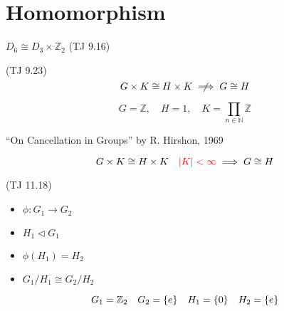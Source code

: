 \section{Homomorphism}

\begin{frame}{$D_6 \cong D_3 \times \mathbb{Z}_{2}$ (TJ 9.16)}
\end{frame}

\begin{frame}{(TJ 9.23)}
  \[
    G \times K \cong H \times K \centernot\implies G \cong H
  \]

  \[
    G = \mathbb{Z}, \quad H = {1}, \quad K = \prod_{n \in \mathbb{N}} \mathbb{Z}
  \]

  \centerline{``On Cancellation in Groups'' by R. Hirshon, 1969}

  \[
    G \times K \cong H \times K \quad \textcolor{red}{|K| < \infty} \implies G \cong H
  \]
\end{frame}
\begin{frame}{(TJ 11.18)}
  \begin{itemize}
    \item $\phi: G_1 \to G_2$
    \item $H_1 \triangleleft G_1$
    \item $\phi(H_1) = H_2$
    \item $G_1/H_1 \cong G_2/H_2$
  \end{itemize}

  \[
    G_1 = \mathbb{Z}_{2} \quad G_2 = \{e\} \quad H_1 = \{0\} \quad H_2 = \{e\}
  \]
\end{frame}

